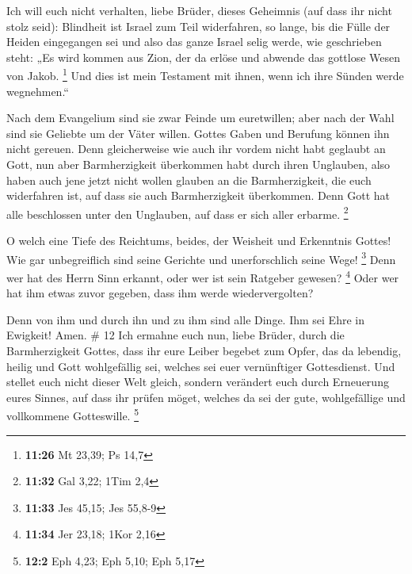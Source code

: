  Ich will euch nicht verhalten, liebe Brüder, dieses
Geheimnis (auf dass ihr nicht stolz seid): Blindheit ist Israel zum Teil
widerfahren, so lange, bis die Fülle der Heiden eingegangen sei
 und also das ganze Israel selig werde, wie geschrieben
steht: „Es wird kommen aus Zion, der da erlöse und abwende das gottlose
Wesen von Jakob. \footnote{\textbf{11:26} Mt 23,39; Ps 14,7}
 Und dies ist mein Testament mit ihnen, wenn ich ihre
Sünden werde wegnehmen.``

 Nach dem Evangelium sind sie zwar Feinde um euretwillen;
aber nach der Wahl sind sie Geliebte um der Väter willen. 
Gottes Gaben und Berufung können ihn nicht gereuen.  Denn
gleicherweise wie auch ihr vordem nicht habt geglaubt an Gott, nun aber
Barmherzigkeit überkommen habt durch ihren Unglauben,  also
haben auch jene jetzt nicht wollen glauben an die Barmherzigkeit, die
euch widerfahren ist, auf dass sie auch Barmherzigkeit überkommen.
 Denn Gott hat alle beschlossen unter den Unglauben, auf
dass er sich aller erbarme. \footnote{\textbf{11:32} Gal 3,22; 1Tim 2,4}

 O welch eine Tiefe des Reichtums, beides, der Weisheit und
Erkenntnis Gottes! Wie gar unbegreiflich sind seine Gerichte und
unerforschlich seine Wege! \footnote{\textbf{11:33} Jes 45,15; Jes
  55,8-9}  Denn wer hat des Herrn Sinn erkannt, oder wer
ist sein Ratgeber gewesen? \footnote{\textbf{11:34} Jer 23,18; 1Kor 2,16}
 Oder wer hat ihm etwas zuvor gegeben, dass ihm werde
wiedervergolten?

 Denn von ihm und durch ihn und zu ihm sind alle Dinge. Ihm
sei Ehre in Ewigkeit! Amen. \# 12  Ich ermahne euch nun,
liebe Brüder, durch die Barmherzigkeit Gottes, dass ihr eure Leiber
begebet zum Opfer, das da lebendig, heilig und Gott wohlgefällig sei,
welches sei euer vernünftiger Gottesdienst.  Und stellet
euch nicht dieser Welt gleich, sondern verändert euch durch Erneuerung
eures Sinnes, auf dass ihr prüfen möget, welches da sei der gute,
wohlgefällige und vollkommene Gotteswille. \footnote{\textbf{12:2} Eph
  4,23; Eph 5,10; Eph 5,17}

